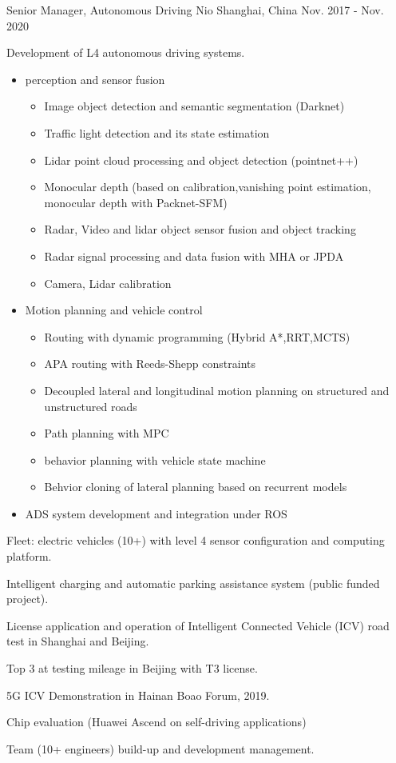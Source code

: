 \documentclass[../cv.tex]{subfiles}
\begin{document}
\begin{cventries}
	\cventry
	{Senior Manager, Autonomous Driving} %
	{Nio} %
	{Shanghai, China} %
	{Nov. 2017 - Nov. 2020} %
	{
		\begin{cvitems}
			\item Development of L4 autonomous driving systems.
			  \begin{itemize}
			    \item perception and sensor fusion
				  \begin{itemize}
					\item Image object detection and semantic segmentation (Darknet)
					\item Traffic light detection and its state estimation
					\item Lidar point cloud processing and object detection (pointnet++)
					\item Monocular depth (based on calibration,vanishing point estimation, monocular depth with Packnet-SFM)
				  	\item Radar, Video and lidar object sensor fusion and object tracking
					\item Radar signal processing and data fusion with MHA or JPDA
					\item Camera, Lidar calibration
				  \end{itemize}
			    \item Motion planning and vehicle control
				  \begin{itemize}
				  	\item Routing with dynamic programming (Hybrid A*,RRT,MCTS)
					\item APA routing with Reeds-Shepp constraints
					\item Decoupled lateral and longitudinal motion planning on structured and unstructured roads
					\item Path planning with MPC
					\item behavior planning with vehicle state machine
					\item Behvior cloning of lateral planning based on recurrent models
				  \end{itemize}
				\item ADS system development and integration under ROS
			\end{itemize}
			\item Fleet: electric vehicles (10+) with level 4 sensor configuration and computing platform.
			\item Intelligent charging and automatic parking assistance system (public funded project).
			\item License application and operation of Intelligent Connected Vehicle (ICV) road test in Shanghai and Beijing.
			\item Top 3 at testing mileage in Beijing with T3 license.
			\item 5G ICV Demonstration in Hainan Boao Forum, 2019.
			\item Chip evaluation (Huawei Ascend on self-driving applications)
			\item Team (10+ engineers) build-up and development management.
		\end{cvitems}
	}


\end{cventries}
\end{document}
